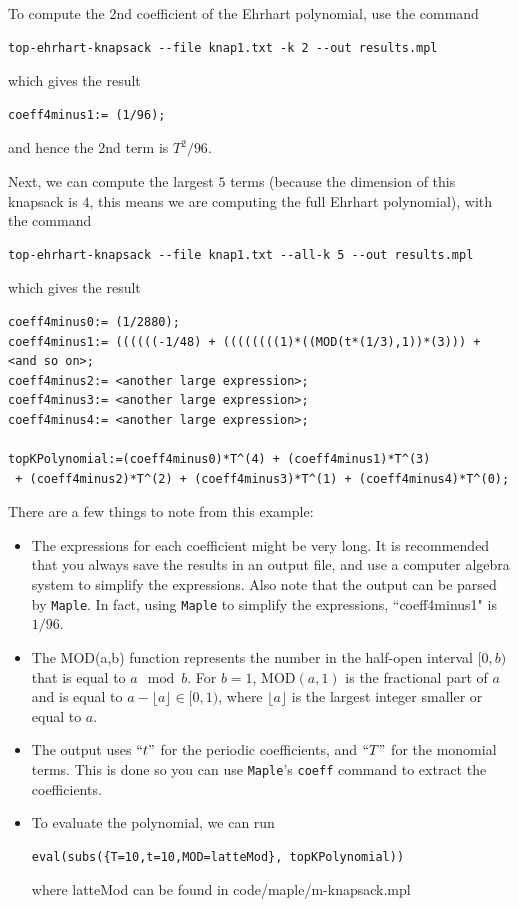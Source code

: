\documentclass{article}
\newcommand{\maple}{{\tt Maple}\xspace}
\begin{document}
To compute the 2nd coefficient of the Ehrhart polynomial,  use the command
\begin{verbatim}
top-ehrhart-knapsack --file knap1.txt -k 2 --out results.mpl
\end{verbatim}
which gives the result
\begin{verbatim}
coeff4minus1:= (1/96);
\end{verbatim}
and hence the 2nd term is $T^2/96$.

Next, we can compute the largest $5$ terms (because the dimension of this knapsack is $4$, this means we are computing the full Ehrhart polynomial), with the command
\begin{verbatim}
top-ehrhart-knapsack --file knap1.txt --all-k 5 --out results.mpl
\end{verbatim}
which gives the result
\begin{verbatim}
coeff4minus0:= (1/2880);
coeff4minus1:= ((((((-1/48) + ((((((((1)*((MOD(t*(1/3),1))*(3))) + <and so on>;
coeff4minus2:= <another large expression>;
coeff4minus3:= <another large expression>;
coeff4minus4:= <another large expression>;

topKPolynomial:=(coeff4minus0)*T^(4) + (coeff4minus1)*T^(3) 
 + (coeff4minus2)*T^(2) + (coeff4minus3)*T^(1) + (coeff4minus4)*T^(0);
\end{verbatim}

There are a few things to note from this example:
\begin{itemize}
\item The expressions for each coefficient might be very long. It is recommended that you always save the results in an output file, and use a computer algebra system to simplify the expressions. Also note that the output can be parsed by \maple. In fact, using \maple to simplify the expressions, ``coeff4minus1" is $1/96$.

\item The $\text{MOD}$(a,b) function represents the number in the half-open interval $[0,b)$ that is equal to $a \mod b$. For $b=1$, $\text{MOD}(a,1)$ is the fractional part of $a$ and is equal to $a - \lfloor a \rfloor \in [0,1)$, where $\lfloor a \rfloor$ is  the largest integer smaller or equal to $a$.

\item The output uses $``t"$ for the periodic coefficients, and $``T"$ for the monomial terms. This is done so you can use \maple's {\tt coeff} command to extract the coefficients. 

\item To evaluate the polynomial, we can run 
\begin{verbatim}
eval(subs({T=10,t=10,MOD=latteMod}, topKPolynomial))
\end{verbatim}
where latteMod can be found in code/maple/m-knapsack.mpl
\end{itemize}
\end{document}
